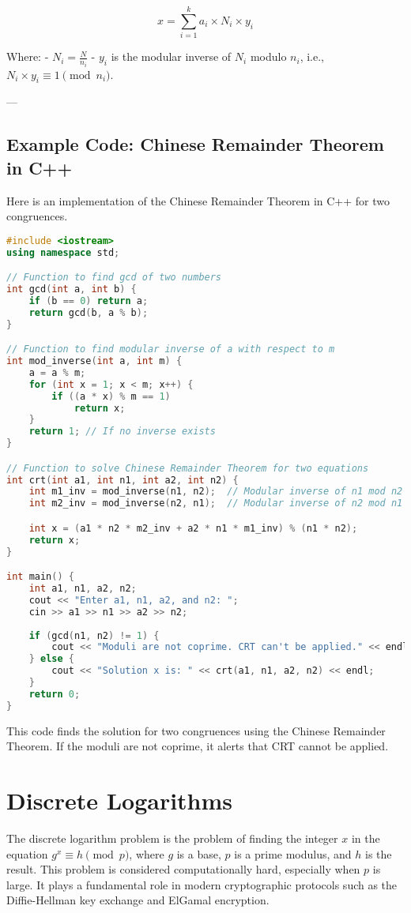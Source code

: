 \documentclass[10pt,a4paper]{article}
\begin{document}
\[
x = \sum_{i=1}^{k} a_i \times N_i \times y_i
\]

Where:
- \(N_i = \frac{N}{n_i}\)
- \(y_i\) is the modular inverse of \(N_i\) modulo \(n_i\), i.e., \(N_i \times y_i \equiv 1 \pmod{n_i}\).

---

\subsection*{Example Code: Chinese Remainder Theorem in C++}

Here is an implementation of the Chinese Remainder Theorem in C++ for two congruences.

\begin{lstlisting}[language=C++]
#include <iostream>
using namespace std;

// Function to find gcd of two numbers
int gcd(int a, int b) {
    if (b == 0) return a;
    return gcd(b, a % b);
}

// Function to find modular inverse of a with respect to m
int mod_inverse(int a, int m) {
    a = a % m;
    for (int x = 1; x < m; x++) {
        if ((a * x) % m == 1)
            return x;
    }
    return 1; // If no inverse exists
}

// Function to solve Chinese Remainder Theorem for two equations
int crt(int a1, int n1, int a2, int n2) {
    int m1_inv = mod_inverse(n1, n2);  // Modular inverse of n1 mod n2
    int m2_inv = mod_inverse(n2, n1);  // Modular inverse of n2 mod n1

    int x = (a1 * n2 * m2_inv + a2 * n1 * m1_inv) % (n1 * n2);
    return x;
}

int main() {
    int a1, n1, a2, n2;
    cout << "Enter a1, n1, a2, and n2: ";
    cin >> a1 >> n1 >> a2 >> n2;
    
    if (gcd(n1, n2) != 1) {
        cout << "Moduli are not coprime. CRT can't be applied." << endl;
    } else {
        cout << "Solution x is: " << crt(a1, n1, a2, n2) << endl;
    }
    return 0;
}
\end{lstlisting}

This code finds the solution for two congruences using the Chinese Remainder Theorem. If the moduli are not coprime, it alerts that CRT cannot be applied.


\section*{Discrete Logarithms}

The discrete logarithm problem is the problem of finding the integer \(x\) in the equation \(g^x \equiv h \pmod{p}\), where \(g\) is a base, \(p\) is a prime modulus, and \(h\) is the result. This problem is considered computationally hard, especially when \(p\) is large. It plays a fundamental role in modern cryptographic protocols such as the Diffie-Hellman key exchange and ElGamal encryption.
\end{document}
